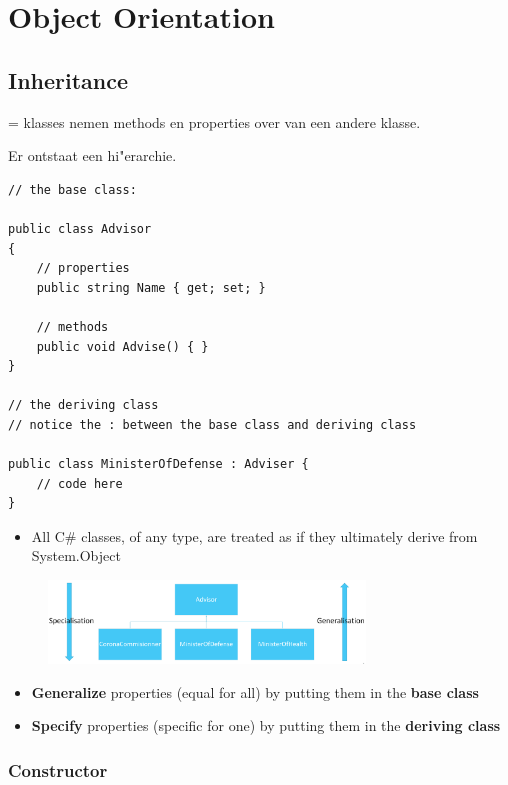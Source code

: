 \documentclass{article}
\newcommand{\bold}[1]{\textbf{#1}}
\begin{document}
\section{Object Orientation}

\subsection{Inheritance}

= klasses nemen methods en properties over van een andere klasse. 

Er ontstaat een hi"erarchie.

\begin{verbatim}
// the base class: 

public class Advisor
{
    // properties
    public string Name { get; set; }

    // methods
    public void Advise() { }
}

// the deriving class
// notice the : between the base class and deriving class

public class MinisterOfDefense : Adviser {
    // code here
}

\end{verbatim}

\begin{itemize}
    \item All C\# classes, of any type, are treated as if they ultimately derive from System.Object
\end{itemize}

\begin{figure}[H]
    \centering
    \includegraphics[width=0.75\textwidth]{inheritance.png}
    \caption{}
\end{figure}

\begin{itemize}
    \item \bold{Generalize} properties (equal for all) by putting them in the \bold{base class}
    \item \bold{Specify} properties (specific for one) by putting them in the \bold{deriving class}
\end{itemize}

\subsubsection{Constructor}
\end{document}
